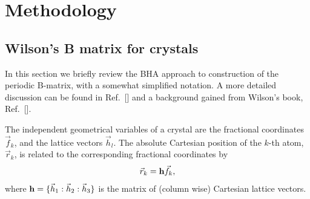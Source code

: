 \twolinestyle{\documentclass[prb,preprint]{revtex4}}
\begin{document}
\section{Methodology}

\subsection{Wilson's B matrix for crystals} \label{crystalBmat}

In this section we briefly review the BHA approach to construction
of the periodic B-matrix, with a somewhat simplified notation.  
A more detailed discussion can be found in Ref.~[] 
and a background gained from Wilson's book, Ref.~[].

The independent geometrical variables of a crystal are the 
fractional coordinates $\vec{f}_{k}$, and the lattice vectors $\vec{h}_{l}$.
The absolute Cartesian position of the $k$-th atom, $\vec{r}_{k}$, 
is related to the corresponding fractional coordinates by
\begin{equation}
\vec{r}_{k} = {\bf h} \vec{f}_{k} ,
\end{equation}
where ${\bf h}=\{\vec{h}_1:\vec{h}_2:\vec{h}_3\}$ is the matrix of (column wise) Cartesian lattice vectors.
\end{document}
